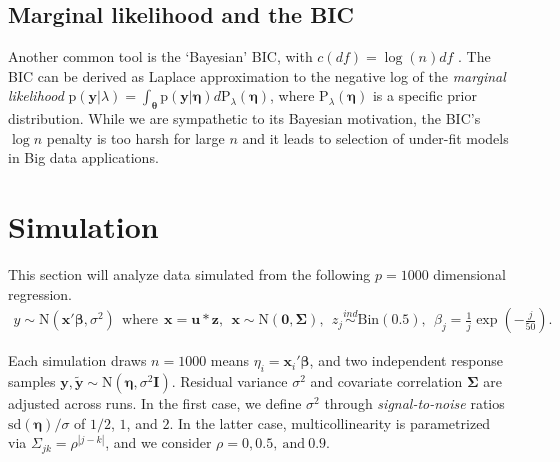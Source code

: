 \documentclass[12pt]{article}
\newcommand{\bs}[1]{\boldsymbol{#1}}
\newcommand{\mr}[1]{\mathrm{#1}}
\newcommand{\bm}[1]{\mathbf{#1}}
\begin{document}
\subsection{Marginal likelihood and the BIC}

Another common tool is the `Bayesian' BIC, with  $c(df) =\log(n)df$
\citep{schwarz_estimating_1978}.  The BIC can be derived
\citep{kass_bayes_1995,de_bruijn_asymptotic_1958} as Laplace approximation
 to the negative log of the {\it marginal likelihood} $\mr{p}(\bm{y} |
\lambda) = \int_{\bs{\theta}}
\mr{p}( \bm{y} | \bs{\eta} ) d\mr{P}_\lambda(\bs{\eta})$, where
$\mr{P}_\lambda(\bs{\eta})$ is a specific prior distribution. While we are
sympathetic to its Bayesian motivation, the BIC's $\log n$ penalty is too
harsh for large $n$ and it leads to selection of under-fit models in Big data
applications.  

\section{Simulation}
\label{sim}

This section will  analyze data simulated from
 the following $p=1000$ dimensional regression.
\begin{align}
\label{simdgp}
y \sim \mr{N}\left(\bm{x}'\bs{\beta},\sigma^2\right)~~\text{where}~~\bm{x} = \bm{u}*\bm{z},~~\bm{x}\sim \mr{N}\left(\bm{0},\bs{\Sigma}\right),~~z_{j} \stackrel{ind}{\sim} \mr{Bin}(0.5),~~\beta_j = \frac{1}{j}\exp\left(-\frac{j}{50}\right).
\end{align}

\vspace{-.4cm}
\noindent
Each simulation draws $n=1000$ means $\eta_i =
\bm{x}_i'\bs{\beta}$, and two independent response samples 
$\bm{y},\bm{\tilde y} \sim \mr{N}(\bs{\eta},\sigma^2\bm{I})$. Residual
variance $\sigma^2$ and covariate correlation $\bs{\Sigma}$ are adjusted across
runs.  In the first case, we define $\sigma^2$ through {\it signal-to-noise}
ratios $\mr{sd}(\bs{\eta})/\sigma$ of $1/2$, $1$, and $2$.  In the latter
case, multicollinearity is parametrized via $\Sigma_{jk} =
\rho^{|j-k|}$, and we consider $\rho = 0, 0.5,~\text{and}~0.9$.
\end{document}
